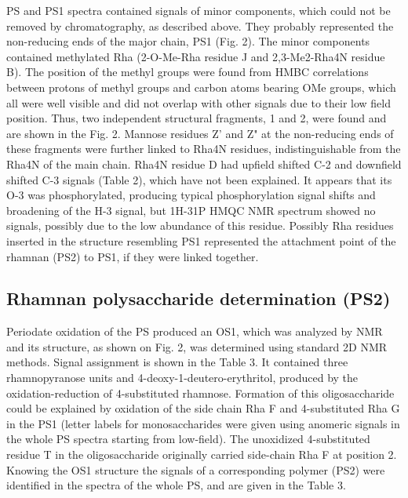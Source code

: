 		 \ac{PS} and \ac{PS}1 spectra contained signals of minor components, which could not be removed by chromatography, as described above. They probably represented the non-reducing ends of the major chain, \ac{PS}1 (Fig. 2). The minor components contained methylated Rha (2-O-Me-Rha residue J and 2,3-Me2-Rha4N residue B). The position of the methyl groups were found from \ac{HMBC} correlations between protons of methyl groups and carbon atoms bearing OMe groups, which all were well visible and did not overlap with other signals due to their low field position. Thus, two independent structural fragments, 1 and 2, were found and are shown in the Fig. 2. Mannose residues Z' and Z" at the non-reducing ends of these fragments were further linked to Rha4N residues, indistinguishable from the Rha4N of the main chain. Rha4N residue D had upfield shifted C-2 and downfield shifted C-3 signals (Table 2), which have not been explained. It appears that its O-3 was phosphorylated, producing typical phosphorylation signal shifts and broadening of the H-3 signal, but 1H-31P \ac{HMQC} \ac{NMR} spectrum showed no signals, possibly due to the low abundance of this residue. Possibly Rha residues inserted in the structure resembling PS1 represented the attachment point of the rhamnan (PS2) to \ac{PS}1, if they were linked together.

	\subsection{Rhamnan polysaccharide determination (PS2)} %
	\label{sub:rhamnan_polysaccharide_determination_ps2_}

		Periodate oxidation of the \ac{PS} produced an \ac{OS}1, which was analyzed by \ac{NMR} and its structure, as shown on Fig. 2, was determined using standard 2D \ac{NMR} methods. Signal assignment is shown in the Table 3. It contained three rhamnopyranose units and 4-deoxy-1-deutero-erythritol, produced by the oxidation-reduction of 4-substituted rhamnose. Formation of this oligosaccharide could be explained by oxidation of the side chain Rha F and 4-substituted Rha G in the \ac{PS}1 (letter labels for monosaccharides were given using anomeric signals in the whole \ac{PS} spectra starting from low-field). The unoxidized 4-substituted residue T in the oligosaccharide originally carried side-chain Rha F at position 2. Knowing the \ac{OS}1 structure the signals of a corresponding polymer (\ac{PS}2) were identified in the spectra of the whole \ac{PS}, and are given in the Table 3. 


